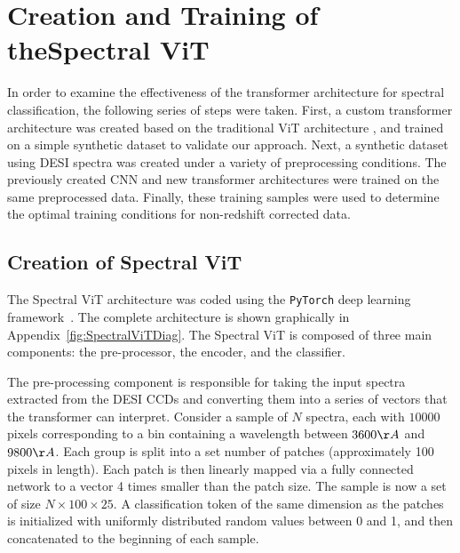 \chapter[Creation and Training of Spectral ViT]{Creation and Training of the\newline Spectral ViT}
\label{chap:methods}

In order to examine the effectiveness of the transformer architecture for
spectral classification, the following series of steps were taken. First, a custom transformer 
architecture was created based on the traditional ViT architecture \parencite{dosovitskiy2020}, 
and trained on a simple synthetic dataset to validate our approach. Next, a synthetic dataset 
using DESI spectra was created under a variety of preprocessing conditions. The previously 
created CNN and new transformer architectures were trained on the
same preprocessed data. Finally, these training samples were used to determine 
the optimal training conditions for non-redshift corrected data. 

\section{Creation of Spectral ViT}\label{sec:SpecViT}
The Spectral ViT architecture was coded using the \texttt{PyTorch}
deep learning framework~\parencite{PyTorch2019}. The complete architecture is shown graphically in
Appendix~\ref{fig:SpectralViTDiag}. The Spectral ViT is composed of three main components:
the pre-processor, the encoder, and the classifier. 

The pre-processing component is responsible for taking the 
input spectra extracted from the DESI CCDs and converting them into a series of 
vectors that the transformer can interpret. 
Consider a sample of $N$ spectra, each with $10000$ pixels corresponding to a bin containing a wavelength 
between $3600\AA$ and $9800\AA$. Each group is split into a set number of patches 
(approximately 100 pixels in length). Each patch is then 
linearly mapped via a fully connected network to a vector 4 times smaller than the patch size.
The sample is now a set of size $N\times100\times25$. A classification token of the same dimension as the patches 
is initialized with uniformly distributed random values between 0 and 1, and then concatenated to the beginning of each sample.

